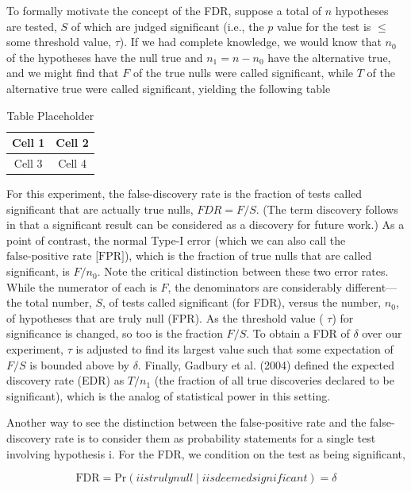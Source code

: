\documentclass{article}
\begin{document}
To formally motivate the concept of the FDR, suppose a total of $n$ hypotheses are tested, $S$ of which are judged significant (i.e., the $p$ value for the test is $\leq$ some threshold value, $\tau$). If we had complete knowledge, we would know that $n_{0}$ of the hypotheses have the null true and $n_{1}=n-n_{0}$ have the alternative true, and we might find that $F$ of the true nulls were called significant, while $T$ of the alternative true were called significant, yielding the following table

\begin{table}[h]
\centering
\begin{tabular}{|c|c|}
\hline
Cell 1 & Cell 2 \\
\hline
Cell 3 & Cell 4 \\
\hline
\end{tabular}
\caption{Table Placeholder}
\end{table}

For this experiment, the false-discovery rate is the fraction of tests called significant that are actually true nulls,  $ FDR = F/S $. (The term  $ \text{discovery} $ follows in that a significant result can be considered as a discovery for future work.) As a point of contrast, the normal Type-I error (which we can also call the  $ \text{false-positive rate [FPR]} $), which is the fraction of true nulls that are called significant, is  $ F/n_0 $. Note the critical distinction between these two error rates. While the numerator of each is  $ F $, the denominators are considerably different—the total number,  $ S $, of tests called significant (for FDR), versus the number,  $ n_0 $, of hypotheses that are truly null (FPR). As the threshold value ( $ \tau $) for significance is changed, so too is the fraction  $ F/S $. To obtain a FDR of  $ \delta $ over our experiment,  $ \tau $ is adjusted to find its largest value such that some expectation of  $ F/S $ is bounded above by  $ \delta $. Finally, Gadbury et al. (2004) defined the expected discovery rate (EDR) as  $ T/n_1 $ (the fraction of all true discoveries declared to be significant), which is the analog of statistical power in this setting.

Another way to see the distinction between the false-positive rate and the false-discovery rate is to consider them as probability statements for a single test involving hypothesis i. For the FDR, we condition on the test as being significant,

\begin{equation}
\mathrm{FDR}=\mathrm{Pr}(i is truly null\mid i is deemed significant)=\delta
\end{equation}
\end{document}
